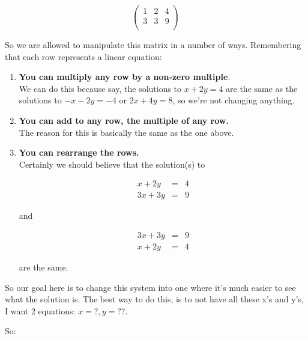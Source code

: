 \documentclass[10pt]{article}
\theoremstyle{definition}
\begin{document}
$$ \left( \begin{array}{rr|r}
1 & 2 & 4\\
3 & 3  & 9\\
\end{array}\right)$$

So we are allowed to manipulate this matrix in a number of ways.  Remembering that each row represents a linear equation:

\begin{enumerate}
\item {\bf You can multiply any row by a non-zero multiple}.\\ 

We can do this because say, the solutions to $x+2y=4$ are the same as the solutions to $-x-2y=-4$ or $2x+4y=8$, so we're not changing anything.

\item {\bf You can add to any row, the multiple of any row.}\\

The reason for this is basically the same as the one above.

\item {\bf You can rearrange the rows.}\\

Certainly we should believe that the solution(s) to

\begin{eqnarray*}
x+2y&=&4\\
3x+3y&=&9
\end{eqnarray*}


and

\begin{eqnarray*}
3x+3y&=&9\\
x+2y&=&4
\end{eqnarray*}

are the same.

\end{enumerate}


So our goal here is to change this system into one where it's much easier to see what the solution is.  The best way to do this, is to not have all these x's and y's, I want 2 equations: $x=?, y=??$.

So:
\end{document}
